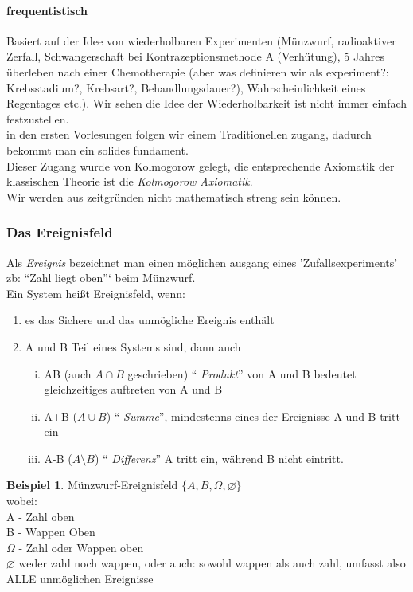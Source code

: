 \documentclass[a4paper]{article}
\theoremstyle{definition}
\newtheorem{beispiel}{Beispiel}%
\theoremstyle{remark}
\begin{document}
\paragraph{frequentistisch}
\label{par:frequentistisch}
Basiert auf der Idee von wiederholbaren Experimenten (Münzwurf, radioaktiver Zerfall, Schwangerschaft bei Kontrazeptionsmethode A (Verhütung), 5 Jahres überleben nach einer Chemotherapie (aber was definieren wir als experiment?: Krebsstadium?, Krebsart?, Behandlungsdauer?), Wahrscheinlichkeit eines Regentages etc.).
Wir sehen die Idee der Wiederholbarkeit ist nicht immer einfach festzustellen.\\
in den ersten Vorlesungen folgen wir einem Traditionellen zugang, dadurch bekommt man ein solides fundament. \\
Dieser Zugang wurde von Kolmogorow gelegt, die entsprechende Axiomatik der klassischen Theorie ist die \textit{Kolmogorow Axiomatik}.\\
Wir werden aus zeitgründen nicht mathematisch streng sein können.\\

\subsubsection{Das Ereignisfeld}
\label{ssub:das_ereignisfeld}

Als \textit{Ereignis} bezeichnet man einen möglichen ausgang eines 'Zufallsexperiments' zb: ``Zahl liegt oben''` beim Münzwurf.\\
Ein System heißt Ereignisfeld, wenn:
\begin{enumerate}
  \item es das Sichere und das unmögliche Ereignis enthält
  \item A und B Teil eines Systems sind, dann auch 
     \begin{enumerate}[(i)]
       \item AB  (auch $A\cap B$ geschrieben) `` \textit{Produkt}'' von A und B bedeutet gleichzeitiges auftreten von A und B
       \item A+B ($A\cup B$) `` \textit{Summe}'', mindestenns eines der Ereignisse A und B tritt ein
       \item A-B ($A\setminus B$) `` \textit{Differenz}'' A tritt ein, während B nicht eintritt.
     \end{enumerate}
\end{enumerate}
\begin{beispiel}
 Münzwurf-Ereignisfeld $\{A,B,\Omega , \varnothing \}$\\
 wobei:\\
 A - Zahl oben\\
 B - Wappen Oben \\
 $\Omega $ - Zahl oder Wappen oben\\
 $\varnothing$ weder zahl noch wappen, oder auch: sowohl wappen als auch zahl, umfasst also ALLE unmöglichen Ereignisse\\
\end{beispiel}
\end{document}
